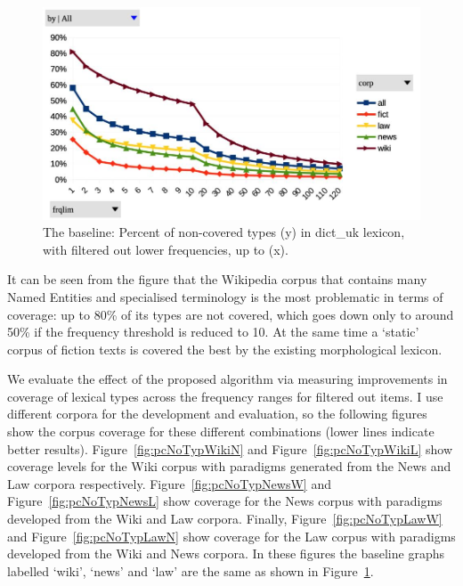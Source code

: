 \documentclass[11pt,a4paper]{article}
\begin{document}
\begin{figure}
	\includegraphics[width=\linewidth]{evaluation-coverage-dict_uk.jpg}
	\caption{The baseline: Percent of non-covered types (y) in dict\_uk lexicon, with filtered out lower frequencies, up to (x).}
	\label{fig:pcNoTypDictUK}
\end{figure}

It can be seen from the figure that the Wikipedia corpus that contains many Named Entities and specialised terminology is the most problematic in terms of coverage: up to 80\% of its types are not covered, which goes down only to around 50\% if the frequency threshold is reduced to 10. At the same time a `static' corpus of fiction texts is covered the best by the existing morphological lexicon.

We evaluate the effect of the proposed algorithm via measuring improvements in coverage of lexical types across the frequency ranges for filtered out items. I use different corpora for the development and evaluation, so the following figures show the corpus coverage for these different combinations (lower lines indicate better results). Figure~\ref{fig:pcNoTypWikiN} and Figure~\ref{fig:pcNoTypWikiL} show coverage levels for the Wiki corpus with paradigms generated from the News and Law corpora respectively. Figure~\ref{fig:pcNoTypNewsW} and Figure~\ref{fig:pcNoTypNewsL} show coverage for the News corpus with paradigms developed from the Wiki and Law corpora. Finally, Figure~\ref{fig:pcNoTypLawW} and Figure~\ref{fig:pcNoTypLawN} show coverage for the Law corpus with paradigms developed from the Wiki and News corpora. In these figures the baseline graphs labelled `wiki', `news' and `law' are the same as shown in Figure~\ref{fig:pcNoTypDictUK}.
\end{document}
